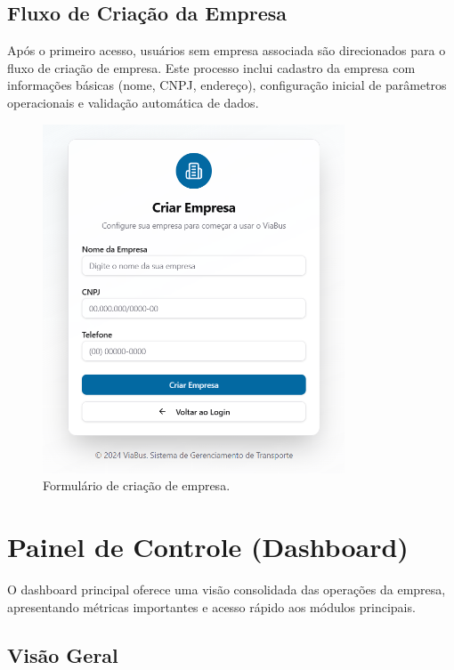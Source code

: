 \subsection{Fluxo de Criação da Empresa}

Após o primeiro acesso, usuários sem empresa associada são direcionados para o fluxo de criação de empresa. Este processo inclui cadastro da empresa com informações básicas (nome, CNPJ, endereço), configuração inicial de parâmetros operacionais e validação automática de dados.

\begin{figure}[H]
  \centering
  \includegraphics[width=0.8\textwidth]{imagens/criacao-empresa.png}
  \caption{Formulário de criação de empresa.}
  \label{fig:criacao-empresa}
\end{figure}

\section{Painel de Controle (Dashboard)}

O dashboard principal oferece uma visão consolidada das operações da empresa, apresentando métricas importantes e acesso rápido aos módulos principais.

\subsection{Visão Geral}

